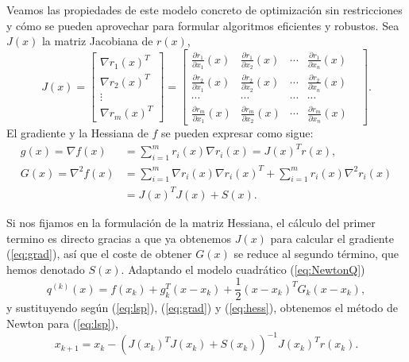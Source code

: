 \documentclass[11pt,a4paper]{book}
\theoremstyle{definition}
\theoremstyle{remark}
\begin{document}

Veamos las propiedades de este modelo concreto de optimización sin restricciones y cómo se pueden aprovechar para formular algoritmos eficientes y robustos.
Sea $J(x)$ la matriz Jacobiana de $r(x)$, 
\begin{equation}
	J(x) = 
	\begin{bmatrix}
		\nabla r_1(x)^T \\
		\nabla r_2(x)^T \\
		\vdots \\
		\nabla r_m(x)^T
	\end{bmatrix}
	=
	\begin{bmatrix}
		\frac{\partial r_1}{\partial x_1}(x) &
		\frac{\partial r_1}{\partial x_2}(x) &
		\cdots &
		\frac{\partial r_1}{\partial x_n}(x) \\
		
		\frac{\partial r_2}{\partial x_1}(x) &
		\frac{\partial r_2}{\partial x_2}(x) &
		\cdots &
		\frac{\partial r_2}{\partial x_n}(x) \\
		
		\cdots &
		\cdots &
		\cdots &
		\cdots & \\
		
		\frac{\partial r_m}{\partial x_1}(x) &
		\frac{\partial r_m}{\partial x_2}(x) &
		\cdots &
		\frac{\partial r_m}{\partial x_n}(x) 
	\end{bmatrix}.
\end{equation}
El gradiente y la Hessiana de $f$ se pueden expresar como sigue:
\begin{align}
	g(x) = \nabla f(x) &= \sum_{i=1}^m r_i(x) \nabla r_i(x) = J(x)^Tr(x), \label{eq:grad}\\
	G(x) = \nabla^2 f(x) &= \sum_{i=1}^m \nabla r_i(x) \nabla r_i(x)^T + \sum_{i=1}^m r_i(x)\nabla^2r_i(x) \nonumber \\
	&= J(x)^TJ(x)+S(x). \label{eq:hess}
\end{align}

Si nos fijamos en la formulación de la matriz Hessiana, el cálculo del primer termino es directo
gracias a que ya obtenemos $J(x)$ para calcular el gradiente (\ref{eq:grad}), así que el coste de obtener
$G(x)$ se reduce
al segundo término, que hemos denotado $S(x)$.
Adaptando el modelo cuadrático (\ref{eq:NewtonQ})
\begin{equation}
	q^{(k)}(x) = f(x_k) + g^T_k(x-x_k) + \frac{1}{2}(x-x_k)^TG_k(x-x_k),
	\label{eq:q}
\end{equation}
y sustituyendo según (\ref{eq:lsp}), (\ref{eq:grad}) y (\ref{eq:hess}), obtenemos el método de Newton para (\ref{eq:lsp}),
\begin{equation}
	x_{k+1} = x_k-(J(x_k)^TJ(x_k)+S(x_k))^{-1}J(x_k)^Tr(x_k).
	\label{eq:newtoniter}
\end{equation}
\end{document}
